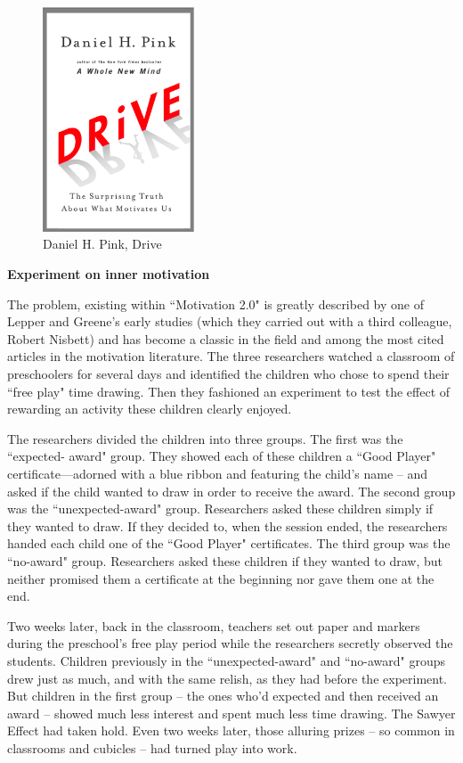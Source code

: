 \begin{figure}
    \centering
    \includegraphics[width=0.4\textwidth]{resources/drive.jpg}
    \caption[Daniel H. Pink, Drive]{Daniel H. Pink, Drive}
\end{figure}

\textbf{Experiment on inner motivation}

The problem, existing within ``Motivation 2.0" is greatly described by one of Lepper and Greene’s early studies (which they carried out with a third colleague, Robert Nisbett) and has become a classic in the field and among the most cited articles in the motivation literature. The three researchers watched a classroom of preschoolers for several days and identified the children who chose to spend their ``free play" time drawing. Then they fashioned an experiment to test the effect of rewarding an activity these children clearly enjoyed.

The researchers divided the children into three groups. The first was the ``expected- award" group. They showed each of these children a ``Good Player" certificate—adorned with a blue ribbon and featuring the child’s name -- and asked if the child wanted to draw in order to receive the award. The second group was the ``unexpected-award" group. Researchers asked these children simply if they wanted to draw. If they decided to, when the session ended, the researchers handed each child one of the ``Good Player" certificates. The third group was the ``no-award" group. Researchers asked these children if they wanted to draw, but neither promised them a certificate at the beginning nor gave them one at the end.

Two weeks later, back in the classroom, teachers set out paper and markers during the preschool’s free play period while the researchers secretly observed the students. Children previously in the ``unexpected-award" and ``no-award" groups drew just as much, and with the same relish, as they had before the experiment. But children in the first group -- the ones who’d expected and then received an award -- showed much less interest and spent much less time drawing. The Sawyer Effect had taken hold. Even two weeks later, those alluring prizes -- so common in classrooms and cubicles -- had turned play into work.

